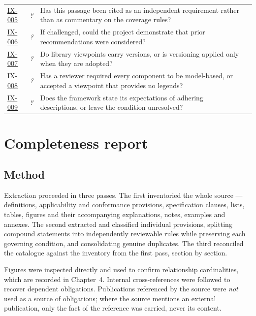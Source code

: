 \documentclass[11pt,a4paper]{report}
\newcommand{\rref}[1]{\hyperref[rule:#1]{\textsf{\small #1}}}
\newcommand{\chkbox}{\raisebox{-0.3pt}{\color{steel}%
  \setlength{\fboxsep}{0pt}\framebox[2.6mm]{\rule{0pt}{2.6mm}}}}
\begin{document}
\begin{center}
\begin{longtable}{@{}L{15mm} C{11mm} L{92mm} C{10mm}@{}}
\rref{IX-005} & {\footnotesize\itshape ?} & {\footnotesize Has this passage been cited as an independent requirement rather than as commentary on the coverage rules?} & \chkbox \\
\rref{IX-006} & {\footnotesize\itshape ?} & {\footnotesize If challenged, could the project demonstrate that prior recommendations were considered?} & \chkbox \\
\rref{IX-007} & {\footnotesize\itshape ?} & {\footnotesize Do library viewpoints carry versions, or is versioning applied only when they are adopted?} & \chkbox \\
\rref{IX-008} & {\footnotesize\itshape ?} & {\footnotesize Has a reviewer required every component to be model-based, or accepted a viewpoint that provides no legends?} & \chkbox \\
\rref{IX-009} & {\footnotesize\itshape ?} & {\footnotesize Does the framework state its expectations of adhering descriptions, or leave the condition unresolved?} & \chkbox \\
\end{longtable}
\end{center}

\chapter{Completeness report}

\section{Method}

Extraction proceeded in three passes. The first inventoried the whole source ---
definitions, applicability and conformance provisions, specification clauses,
lists, tables, figures and their accompanying explanations, notes, examples and
annexes. The second extracted and classified individual provisions, splitting
compound statements into independently reviewable rules while preserving each
governing condition, and consolidating genuine duplicates. The third reconciled
the catalogue against the inventory from the first pass, section by section.

Figures were inspected directly and used to confirm relationship cardinalities,
which are recorded in Chapter~4. Internal cross-references were followed to
recover dependent obligations. Publications referenced by the source were
\emph{not} used as a source of obligations; where the source mentions an
external publication, only the fact of the reference was carried, never its
content.
\end{document}
